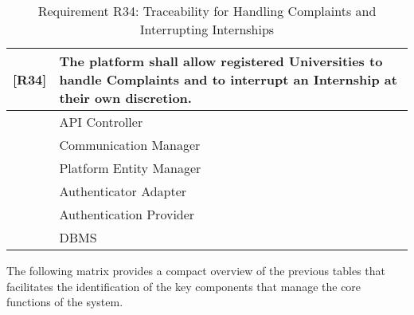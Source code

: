 \begin{table}[H]
    \centering
    \begin{tabular}{|p{1cm}|p{14cm}|}
    \hline
    \textbf{[R34]} & \textbf{The platform shall allow registered Universities to handle Complaints and to interrupt an Internship at their own discretion.} \\ \hline
    [C1] & API Controller \\ \hline
    [C7] & Communication Manager \\ \hline
    [C10] & Platform Entity Manager \\ \hline
    [C11] & Authenticator Adapter \\ \hline
    [E3] & Authentication Provider \\ \hline
    [E4] & DBMS \\ \hline
    \end{tabular}
    \caption{Requirement R34: Traceability for Handling Complaints and Interrupting Internships}
    \label{tab:RT34}
\end{table}
\clearpage
The following matrix provides a compact overview of the previous tables that facilitates the identification of the key components that manage the core functions of the system.
